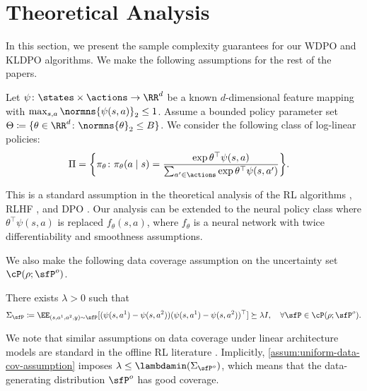\section{Theoretical Analysis}
In this section, we present the sample complexity guarantees for our WDPO and KLDPO algorithms. We make the following assumptions for the rest of the papers. 

\begin{assumption}\label{assum:log-linear-assumption}
    Let $\psi\colon\states\times\actions\to\RR^d$ be a known $d$-dimensional feature mapping with $\max_{s,a}\normns{\psi(s,a)}_2\leq 1$. Assume a bounded policy parameter set $\Theta\coloneqq\{\theta\in\RR^d\colon \normns{\theta}_2\leq B\}$. We consider the following class of log-linear policies:
     \begin{align}\label{eq:log-linear-policy-class}
        \Pi = \bigg\{\pi_\theta\colon \pi_\theta(a\mid s)&=\frac{\exp{\theta^{\top}\psi(s,a)}}{\sum_{a'\in\actions}\exp{\theta^{\top}\psi(s,a')}} \bigg\}.
    \end{align}

\end{assumption}
\begin{remark}
    This is a standard assumption in the  theoretical analysis of the RL algorithms \citep{agarwal2021theory,modi2020sample}, RLHF \citep{zhu2023principled}, and DPO  \citep{nika2024reward,chowdhury2024provably}. Our analysis can be extended to the neural policy class where $\theta^{\top}\psi(s,a)$ is replaced $f_\theta(s,a)$, where $f_\theta$ is a neural network with twice differentiability and smoothness assumptions.

\end{remark}
We also make the following data coverage assumption on the uncertainty set $\cP(\rho;\sfP^o)$.
\begin{assumption}\label{assum:uniform-data-cov-assumption}
   There exists $\lambda>0$ such that
    \begin{align*}
        \Sigma_{\sfP}\coloneqq\EE_{(s,a^1,a^2,y)\sim\sfP}[(\psi(s,a^1)-\psi(s,a^2))(\psi(s,a^1)-\psi(s,a^2))^{\top}] \succeq \lambda I, \quad\forall \sfP\in\cP(\rho;\sfP^o).
    \end{align*}
\end{assumption}
\begin{remark}
    We note that similar assumptions on data coverage under linear architecture models are standard in the offline RL literature \citep{agarwal2019reinforcement,wang2021what,jin2021pessimism}.
    Implicitly, \cref{assum:uniform-data-cov-assumption} imposes $\lambda\leq \lambdamin(\Sigma_{\sfP^o})$, which means that the data-generating distribution $\sfP^o$ has good coverage. 

\end{remark}



